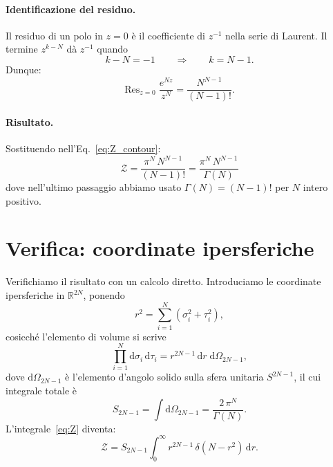 \documentclass[a4paper,11pt]{article}
\newcommand{\de}{\mathrm{d}}
\begin{document}
\paragraph{Identificazione del residuo.}
Il residuo di un polo in $z = 0$ è il coefficiente di $z^{-1}$ nella
serie di Laurent. Il termine $z^{k-N}$ dà $z^{-1}$ quando
\begin{equation}
  k - N = -1 \qquad \Longrightarrow \qquad k = N - 1 .
\end{equation}
Dunque:
\begin{equation}\label{eq:residuo}
  \mathrm{Res}_{z=0}\; \frac{e^{Nz}}{z^N}
  = \frac{N^{N-1}}{(N-1)!} .
\end{equation}

\paragraph{Risultato.}
Sostituendo nell'Eq.~\eqref{eq:Z_contour}:
\begin{equation}\label{eq:Z_exact}
  \boxed{
  \mathcal{Z}
  = \frac{\pi^N \, N^{N-1}}{(N-1)!}
  = \frac{\pi^N \, N^{N-1}}{\Gamma(N)}
  }
\end{equation}
dove nell'ultimo passaggio abbiamo usato $\Gamma(N) = (N-1)!$ per
$N$ intero positivo.

\section{Verifica: coordinate ipersferiche}

Verifichiamo il risultato con un calcolo diretto.  Introduciamo le
coordinate ipersferiche in $\mathbb{R}^{2N}$, ponendo
\begin{equation}
  r^2 = \sum_{i=1}^{N} (\sigma_i^2 + \tau_i^2) ,
\end{equation}
cosicché l'elemento di volume si scrive
\begin{equation}
  \prod_{i=1}^{N} \de\sigma_i\,\de\tau_i
  = r^{2N-1}\,\de r\;\de\Omega_{2N-1} ,
\end{equation}
dove $\de\Omega_{2N-1}$ è l'elemento d'angolo solido sulla sfera
unitaria $S^{2N-1}$, il cui integrale totale è
\begin{equation}\label{eq:solid_angle}
  S_{2N-1} = \int \de\Omega_{2N-1}
           = \frac{2\,\pi^N}{\Gamma(N)} .
\end{equation}
L'integrale~\eqref{eq:Z} diventa:
\begin{equation}
  \mathcal{Z}
  = S_{2N-1} \int_0^{\infty} r^{2N-1}\,
    \delta(N - r^2)\,\de r .
\end{equation}
\end{document}
